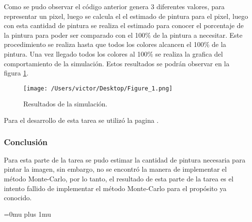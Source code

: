 \documentclass{article}
\begin{document}
 Como se pudo observar el código anterior genera 3 diferentes valores, para representar un pixel, luego se calcula el el estimado de pintura para el pixel, luego con esta cantidad de pintura se realiza el estimado para conocer el porcentaje de la pintura para poder ser comparado con el 100$\%$ de la pintura a necesitar. Este procedimiento se realiza hasta que todos los colores alcancen el 100$\%$ de la pintura. Una vez llegado todos los colores al 100$\%$ se realiza la grafica del comportamiento de la simulación. Estos resultados se podrán observar en la figura \ref{fig:cuadro.2}.
 
 
\begin{figure}[H]
\begin{center}
	\texttt{[image: /Users/victor/Desktop/Figure\_1.png]}
	\caption{ Resultados de la simulación.}
	\label{fig:cuadro.2}
\end{center}
\end{figure}
 
Para el desarrollo de esta tarea se utilizó la pagina \citep{DRA.Code}.


\subsubsection{Conclusión}
 Para esta parte de la tarea se pudo estimar la cantidad de pintura necesaria para pintar la imagen, sin embargo, no se encontró la manera de implementar el método Monte-Carlo, por lo tanto, el resultado de esta parte de la tarea es el intento fallido  de implementar el método Monte-Carlo para el propósito ya conocido. 









\Urlmuskip=0mu plus 1mu\relax


\end{document}
